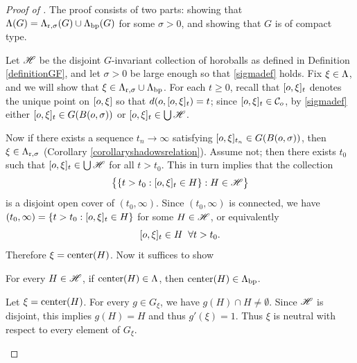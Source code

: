 \begin{proof}[Proof of ]
The proof consists of two parts: showing that $\Lambda(G) = \Lrsigma(G) \cup \Lbp(G)$ for some $\sigma > 0$, and showing that $G$ is of compact type.

\begin{subproof}[Proof that $\Lambda(G) = \Lrsigma(G) \cup \Lbp(G)$ for some $\sigma > 0$]
Let $\mathscr H$ be the disjoint $G$-invariant collection of horoballs as defined in Definition \ref{definitionGF}, and let $\sigma > 0$ be large enough so that \eqref{sigmadef} holds. Fix $\xi\in\Lambda$, and we will show that $\xi\in\Lambda_{\mathrm r,\sigma}\cup\Lambda_{\mathrm{bp}}$. For each $t\geq 0$, recall that $[o,\xi]_t$ denotes the unique point on $[o,\xi]$ so that $d(o,[o,\xi]_t) = t$; since $[o,\xi]_t\in\mathcal C_o$, by \eqref{sigmadef} either $[o,\xi]_t\in G(B(o,\sigma))$ or $[o,\xi]_t\in\bigcup\mathscr H$.

Now if there exists a sequence $t_n\to \infty$ satisfying $[o,\xi]_{t_n}\in G(B(o,\sigma))$, then $\xi\in\Lambda_{\mathrm r,\sigma}$ (Corollary \ref{corollaryshadowsrelation}). Assume not; then there exists $t_0$ such that $[o,\xi]_t\in\bigcup\mathscr H$ for all $t > t_0$. This in turn implies that the collection
\[
\big\{\{t > t_0: [o,\xi]_t\in H\}: H\in\mathscr H\big\}
\]
is a disjoint open cover of $(t_0,\infty)$. Since $(t_0,\infty)$ is connected, we have $(t_0,\infty) = \{t > t_0: [o,\xi]_t\in H\}$ for some $H\in\mathscr H$, or equivalently
\[
[o,\xi]_t\in H\;\;\forall t > t_0.
\]
Therefore $\xi = \operatorname{center}(H)$. Now it suffices to show 
\begin{lemma}
\label{lemmacentersLbp}
For every $H\in\mathscr H$, if $\operatorname{center}(H)\in\Lambda$, then $\operatorname{center}(H)\in\Lambda_{\mathrm{bp}}$. 
\end{lemma}
\begin{subproof}
Let $\xi = \operatorname{center}(H)$. For every $g\in G_\xi$, we have $g(H)\cap H\neq\emptyset$. Since $\mathscr H$ is disjoint, this implies $g(H) = H$ and thus $g'(\xi) = 1$. Thus $\xi$ is neutral with respect to every element of $G_\xi$.


\end{subproof}
\end{subproof}
\end{proof}
